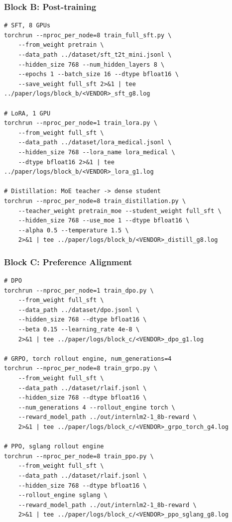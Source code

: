 \subsubsection{Block B: Post-training}

\begin{verbatim}
# SFT, 8 GPUs
torchrun --nproc_per_node=8 train_full_sft.py \
    --from_weight pretrain \
    --data_path ../dataset/sft_t2t_mini.jsonl \
    --hidden_size 768 --num_hidden_layers 8 \
    --epochs 1 --batch_size 16 --dtype bfloat16 \
    --save_weight full_sft 2>&1 | tee ../paper/logs/block_b/<VENDOR>_sft_g8.log

# LoRA, 1 GPU
torchrun --nproc_per_node=1 train_lora.py \
    --from_weight full_sft \
    --data_path ../dataset/lora_medical.jsonl \
    --hidden_size 768 --lora_name lora_medical \
    --dtype bfloat16 2>&1 | tee ../paper/logs/block_b/<VENDOR>_lora_g1.log

# Distillation: MoE teacher -> dense student
torchrun --nproc_per_node=8 train_distillation.py \
    --teacher_weight pretrain_moe --student_weight full_sft \
    --hidden_size 768 --use_moe 1 --dtype bfloat16 \
    --alpha 0.5 --temperature 1.5 \
    2>&1 | tee ../paper/logs/block_b/<VENDOR>_distill_g8.log
\end{verbatim}

\subsubsection{Block C: Preference Alignment}

\begin{verbatim}
# DPO
torchrun --nproc_per_node=1 train_dpo.py \
    --from_weight full_sft \
    --data_path ../dataset/dpo.jsonl \
    --hidden_size 768 --dtype bfloat16 \
    --beta 0.15 --learning_rate 4e-8 \
    2>&1 | tee ../paper/logs/block_c/<VENDOR>_dpo_g1.log

# GRPO, torch rollout engine, num_generations=4
torchrun --nproc_per_node=8 train_grpo.py \
    --from_weight full_sft \
    --data_path ../dataset/rlaif.jsonl \
    --hidden_size 768 --dtype bfloat16 \
    --num_generations 4 --rollout_engine torch \
    --reward_model_path ../out/internlm2-1_8b-reward \
    2>&1 | tee ../paper/logs/block_c/<VENDOR>_grpo_torch_g4.log

# PPO, sglang rollout engine
torchrun --nproc_per_node=8 train_ppo.py \
    --from_weight full_sft \
    --data_path ../dataset/rlaif.jsonl \
    --hidden_size 768 --dtype bfloat16 \
    --rollout_engine sglang \
    --reward_model_path ../out/internlm2-1_8b-reward \
    2>&1 | tee ../paper/logs/block_c/<VENDOR>_ppo_sglang_g8.log
\end{verbatim}

